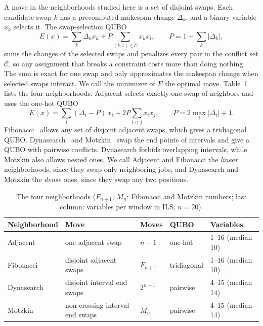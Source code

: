 \documentclass[runningheads]{llncs}
\begin{document}
A move in the neighborhoods studied here is a set of disjoint swaps. Each
candidate swap $k$ has a precomputed makespan change $\Delta_k$, and a binary
variable $x_k$ selects it. The swap-selection QUBO~\cite{lucas2014ising}
\begin{equation}
  E(x) = \sum_k \Delta_k x_k + P \sum_{(k,l) \in \mathcal{C}} x_k x_l ,
  \qquad P = 1 + \sum_k |\Delta_k| ,
\end{equation}
sums the changes of the selected swaps and penalizes every pair in the
conflict set $\mathcal{C}$, so any assignment that breaks a constraint costs
more than doing nothing. The sum is exact for one swap and only approximates
the makespan change when selected swaps interact. We call the minimizer of
$E$ the optimal move. Table~\ref{tab:neigh} lists the four neighborhoods.
Adjacent selects exactly one swap of neighbors and uses the one-hot QUBO
\begin{equation}
  E(x) = \sum_i (\Delta_i - P)\,x_i + 2P \sum_{i<j} x_i x_j ,
  \qquad P = 2\max_i|\Delta_i| + 1 .
\end{equation}
Fibonacci~\cite{bozejko2026new} allows any set of disjoint adjacent swaps,
which gives a tridiagonal QUBO. Dynasearch~\cite{congram2002} and
Motzkin~\cite{wojewodzki2026soco} swap the end points of intervals and give
a QUBO with pairwise conflicts. Dynasearch forbids overlapping intervals,
while Motzkin also allows nested ones. We call Adjacent and Fibonacci the
\emph{linear} neighborhoods, since they swap only neighboring jobs, and
Dynasearch and Motzkin the \emph{dense} ones, since they swap any two positions.

\begin{table}[t]
\caption{The four neighborhoods ($F_{n+1}$, $M_n$: Fibonacci and Motzkin
numbers; last column: variables per window in ILS, $n = 20$).}
\label{tab:neigh}
\centering
\begin{tabular}{lllll}
\toprule
Neighborhood & Move & Moves & QUBO & Variables \\
\midrule
Adjacent   & one adjacent swap              & $n - 1$    & one-hot     & 1--16 (median 10) \\
Fibonacci  & disjoint adjacent swaps        & $F_{n+1}$  & tridiagonal & 1--16 (median 10) \\
Dynasearch & disjoint interval end swaps    & $2^{n-1}$  & pairwise    & 4--15 (median 14) \\
Motzkin    & non-crossing interval end swaps & $M_n$     & pairwise    & 4--15 (median 14) \\
\bottomrule
\end{tabular}
\end{table}
\end{document}
